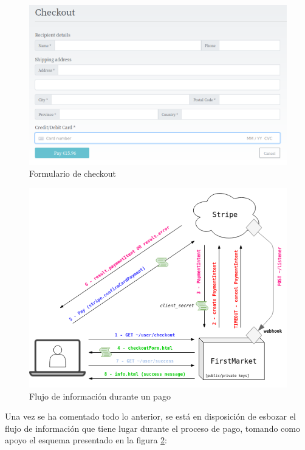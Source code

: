 \documentclass[a4paper]{article}
\begin{document}
    \begin{figure}[hbt!]
    	\centering
    	\includegraphics[width=\textwidth,keepaspectratio]{checkout_form}
    	\caption{Formulario de checkout}
    	\label{fig:checkout_form}
    \end{figure}
    
    \begin{figure}[hbt!]
    	\centering
    	\includegraphics[width=\textwidth,keepaspectratio]{stripe}
    	\caption{Flujo de información durante un pago}
    	\label{fig:stripe}
    \end{figure}
    
    Una vez se ha comentado todo lo anterior, se está en disposición de esbozar el flujo de información que tiene lugar durante el proceso de pago, tomando como apoyo el esquema presentado en la figura \ref{fig:stripe}:
    
\end{document}
